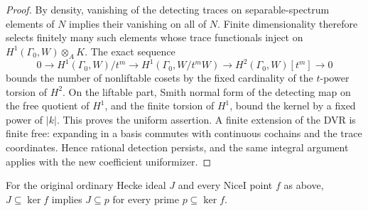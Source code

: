 \begin{proof}
By density, vanishing of the detecting traces on separable-spectrum
elements of $N$ implies their vanishing on all of $N$. Finite
dimensionality therefore selects finitely many such elements
whose trace functionals inject on $H^1(\Gamma_0,W)\otimes_A K$.
The exact sequence
\[
 0\longrightarrow H^1(\Gamma_0,W)/t^m
 \longrightarrow H^1(\Gamma_0,W/t^mW)
 \longrightarrow H^2(\Gamma_0,W)[t^m]\longrightarrow0
\]
bounds the number of nonliftable cosets by the fixed cardinality
of the $t$-power torsion of $H^2$. On the liftable part, Smith
normal form of the detecting map on the free quotient of $H^1$,
and the finite torsion of $H^1$, bound the kernel by a fixed
power of $|k|$. This proves the uniform assertion. A finite
extension of the DVR is finite free: expanding in a basis
commutes with continuous cochains and the trace coordinates.
Hence rational detection persists, and the same integral argument
applies with the new coefficient uniformizer.
\end{proof}

\begin{theorem}
\label{thm:selmer-p1-direct}
For the original ordinary Hecke ideal $J$ and every NiceI point
$f$ as above, $J\subseteq\ker f$ implies $J\subseteq p$
for every prime $p\subseteq\ker f$.
\end{theorem}

